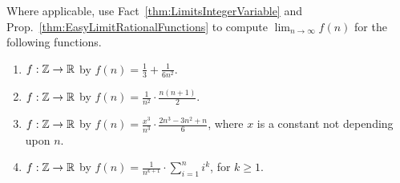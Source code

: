\bigskip

\begin{example} 
\label{ex:IntegerLimits}
Where applicable, use Fact~\ref{thm:LimitsIntegerVariable} and Prop.~\ref{thm:EasyLimitRationalFunctions} to compute $\displaystyle \lim_{n \to \infty} f(n)$ for the following functions. 


\begin{enumerate}
\renewcommand{\labelenumi}{(\alph{enumi})}
\setlength{\itemsep}{.2cm}
     \item  $f:\mathbb Z \to \mathbb R$ by $f(n) = \frac{1}{3} + \frac{1}{6n^2} $.
        \item   $f:\mathbb Z \to \mathbb R$ by $f(n) = \frac{1}{n^2} \cdot \frac{n(n+1)}{2} $.
    \item  $f:\mathbb Z \to \mathbb R$ by $f(n) =  \frac{x^3}{n^3} \cdot \frac{2n^3 - 3n^2 + n}{6}$, where $x$ is a constant not depending upon $n$.
    \item  $f:\mathbb Z \to \mathbb R$ by $f(n) =  \frac{1}{n^{k+1}} \cdot \sum_{i=1}^{n}i^k$, for $k \ge 1$.
\end{enumerate} 
    
\end{example}


